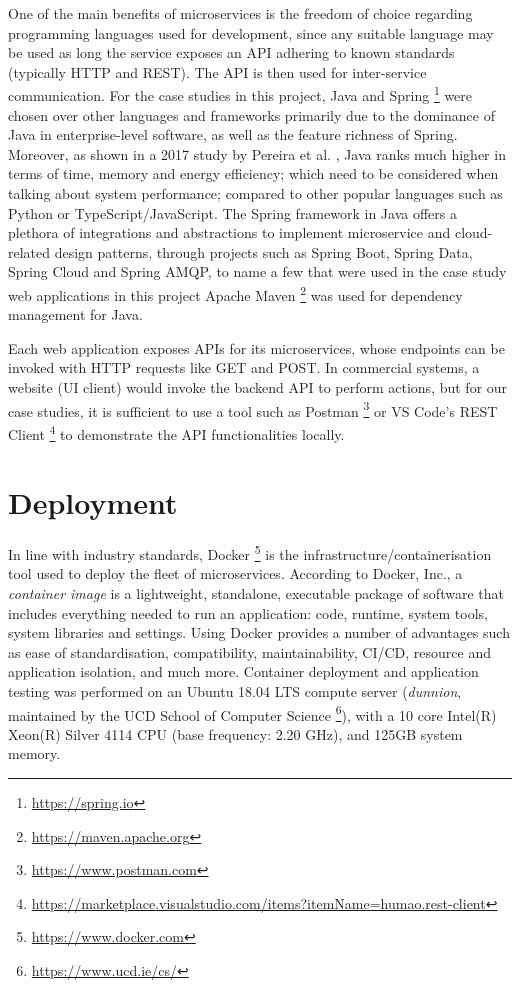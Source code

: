 One of the main benefits of microservices is the freedom of choice regarding programming languages used for development, since any suitable language may be used as long the service exposes an API adhering to known standards (typically HTTP and REST). The API is then used for inter-service communication. For the case studies in this project, Java and Spring \footnote{\url{https://spring.io}} were chosen over other languages and frameworks primarily due to the dominance of Java in enterprise-level software, as well as the feature richness of Spring. Moreover, as shown in a 2017 study by Pereira et al. \cite{pereira17}, Java ranks much higher in terms of time, memory and energy efficiency; which need to be considered when talking about system performance; compared to other popular languages such as Python or TypeScript/JavaScript. The Spring framework in Java offers a plethora of integrations and abstractions to implement microservice and cloud-related design patterns, through projects such as Spring Boot, Spring Data, Spring Cloud and Spring AMQP, to name a few that were used in the case study web applications in this project Apache Maven \footnote{\url{https://maven.apache.org}} was used for dependency management for Java.

Each web application exposes APIs for its microservices, whose endpoints can be invoked with HTTP requests like GET and POST. In commercial systems, a website (UI client) would invoke the backend API to perform actions, but for our case studies, it is sufficient to use a tool such as Postman \footnote{\url{https://www.postman.com}} or VS Code's REST Client \footnote{\url{https://marketplace.visualstudio.com/items?itemName=humao.rest-client}} to demonstrate the API functionalities locally.

\section{Deployment}

In line with industry standards, Docker \footnote{\url{https://www.docker.com}} is the infrastructure/containerisation tool used to deploy the fleet of microservices. According to Docker, Inc., a \textit{container image} is a lightweight, standalone, executable package of software that includes everything needed to run an application: code, runtime, system tools, system libraries and settings. Using Docker provides a number of advantages such as ease of standardisation, compatibility, maintainability, CI/CD, resource and application isolation, and much more. Container deployment and application testing was performed on an Ubuntu 18.04 LTS compute server (\textit{dunnion}, maintained by the UCD School of Computer Science \footnote{\url{https://www.ucd.ie/cs/}}), with a 10 core Intel(R) Xeon(R) Silver 4114 CPU (base frequency: 2.20 GHz), and 125GB system memory.

